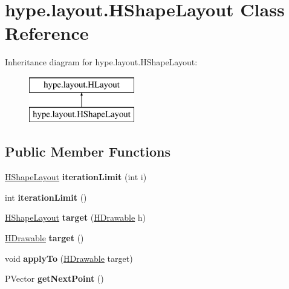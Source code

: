 \hypertarget{classhype_1_1layout_1_1_h_shape_layout}{\section{hype.\-layout.\-H\-Shape\-Layout Class Reference}
\label{classhype_1_1layout_1_1_h_shape_layout}
}
Inheritance diagram for hype.\-layout.\-H\-Shape\-Layout\-:\begin{figure}[H]
\begin{center}
\leavevmode
\includegraphics[height=2.000000cm]{classhype_1_1layout_1_1_h_shape_layout}
\end{center}
\end{figure}
\subsection*{Public Member Functions}
\begin{DoxyCompactItemize}
\item 
\hypertarget{classhype_1_1layout_1_1_h_shape_layout_ab185aa25cfb83352b1ede79870add2a9}{\hyperlink{classhype_1_1layout_1_1_h_shape_layout}{H\-Shape\-Layout} {\bfseries iteration\-Limit} (int i)}\label{classhype_1_1layout_1_1_h_shape_layout_ab185aa25cfb83352b1ede79870add2a9}

\item 
\hypertarget{classhype_1_1layout_1_1_h_shape_layout_a91edcfe8e64b8498bcd44b55ee1bd584}{int {\bfseries iteration\-Limit} ()}\label{classhype_1_1layout_1_1_h_shape_layout_a91edcfe8e64b8498bcd44b55ee1bd584}

\item 
\hypertarget{classhype_1_1layout_1_1_h_shape_layout_a2e0987563bd07ae17cd1d46ad77b1fb4}{\hyperlink{classhype_1_1layout_1_1_h_shape_layout}{H\-Shape\-Layout} {\bfseries target} (\hyperlink{classhype_1_1drawable_1_1_h_drawable}{H\-Drawable} h)}\label{classhype_1_1layout_1_1_h_shape_layout_a2e0987563bd07ae17cd1d46ad77b1fb4}

\item 
\hypertarget{classhype_1_1layout_1_1_h_shape_layout_ab60567fb59e2444d8c85d9f085656fcd}{\hyperlink{classhype_1_1drawable_1_1_h_drawable}{H\-Drawable} {\bfseries target} ()}\label{classhype_1_1layout_1_1_h_shape_layout_ab60567fb59e2444d8c85d9f085656fcd}

\item 
\hypertarget{classhype_1_1layout_1_1_h_shape_layout_a5788eb5b0c7661edad790d500e359822}{void {\bfseries apply\-To} (\hyperlink{classhype_1_1drawable_1_1_h_drawable}{H\-Drawable} target)}\label{classhype_1_1layout_1_1_h_shape_layout_a5788eb5b0c7661edad790d500e359822}

\item 
\hypertarget{classhype_1_1layout_1_1_h_shape_layout_a7afb99af936a130f8b22fb7262d5ac46}{P\-Vector {\bfseries get\-Next\-Point} ()}\label{classhype_1_1layout_1_1_h_shape_layout_a7afb99af936a130f8b22fb7262d5ac46}

\end{DoxyCompactItemize}
